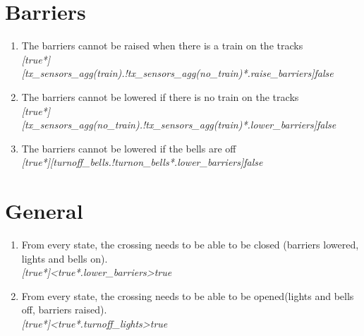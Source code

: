 \documentclass[final]{report}
\begin{document}
\section{Barriers}
\begin{enumerate}
\item The barriers cannot be raised when there is a train on the tracks\\
\textit{[true*][tx\_sensors\_agg(train).!tx\_sensors\_agg(no\_train)*.raise\_barriers]false}
\item The barriers cannot be lowered if there is no train on the tracks\\
\textit{[true*][tx\_sensors\_agg(no\_train).!tx\_sensors\_agg(train)*.lower\_barriers]false}
\item The barriers cannot be lowered if the bells are off\\
\textit{[true*][turnoff\_bells.!turnon\_bells*.lower\_barriers]false}
\end{enumerate}

\section{General}
\begin{enumerate}
\item From every state, the crossing needs to be able to be closed (barriers lowered, lights and bells on).\\
\textit{[true*]<true*.lower\_barriers>true}
\item From every state, the crossing needs to be able to be opened(lights and bells off, barriers raised).\\
\textit{[true*]<true*.turnoff\_lights>true}
\end{enumerate}
\end{document}
